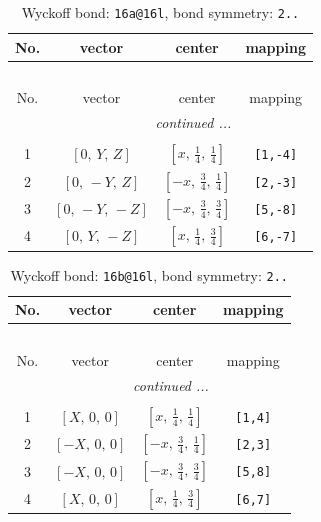 \documentclass[fleqn,8pt]{jsarticle}
\begin{document}
\begin{longtable}{cccc}
\caption{Wyckoff bond: {\tt 16a@16l}, bond symmetry: {\tt 2..}}
 \\
 \hline \hline
No. & vector & center & mapping \\ \hline \endfirsthead

\multicolumn{3}{l}{\tablename\ \thetable{}} \\
 \hline \hline
No. & vector & center & mapping \\ \hline \endhead

 \hline \hline
\multicolumn{3}{r}{\footnotesize\it continued ...} \\ \endfoot

 \hline \hline
\multicolumn{3}{r}{} \\ \endlastfoot

1 & $\left[ 0,\, Y,\, Z \right]$ & $\left[ x,\, \frac{1}{4},\, \frac{1}{4} \right]$ & {\tt [1,-4]} \\ \hline
2 & $\left[ 0,\, - Y,\, Z \right]$ & $\left[ - x,\, \frac{3}{4},\, \frac{1}{4} \right]$ & {\tt [2,-3]} \\ \hline
3 & $\left[ 0,\, - Y,\, - Z \right]$ & $\left[ - x,\, \frac{3}{4},\, \frac{3}{4} \right]$ & {\tt [5,-8]} \\ \hline
4 & $\left[ 0,\, Y,\, - Z \right]$ & $\left[ x,\, \frac{1}{4},\, \frac{3}{4} \right]$ & {\tt [6,-7]} \\
\end{longtable}
\renewcommand{\arraystretch}{1.2}
\begin{longtable}{cccc}
\caption{Wyckoff bond: {\tt 16b@16l}, bond symmetry: {\tt 2..}}
 \\
 \hline \hline
No. & vector & center & mapping \\ \hline \endfirsthead

\multicolumn{3}{l}{\tablename\ \thetable{}} \\
 \hline \hline
No. & vector & center & mapping \\ \hline \endhead

 \hline \hline
\multicolumn{3}{r}{\footnotesize\it continued ...} \\ \endfoot

 \hline \hline
\multicolumn{3}{r}{} \\ \endlastfoot

1 & $\left[ X,\, 0,\, 0 \right]$ & $\left[ x,\, \frac{1}{4},\, \frac{1}{4} \right]$ & {\tt [1,4]} \\ \hline
2 & $\left[ - X,\, 0,\, 0 \right]$ & $\left[ - x,\, \frac{3}{4},\, \frac{1}{4} \right]$ & {\tt [2,3]} \\ \hline
3 & $\left[ - X,\, 0,\, 0 \right]$ & $\left[ - x,\, \frac{3}{4},\, \frac{3}{4} \right]$ & {\tt [5,8]} \\ \hline
4 & $\left[ X,\, 0,\, 0 \right]$ & $\left[ x,\, \frac{1}{4},\, \frac{3}{4} \right]$ & {\tt [6,7]} \\
\end{longtable}
\end{document}

